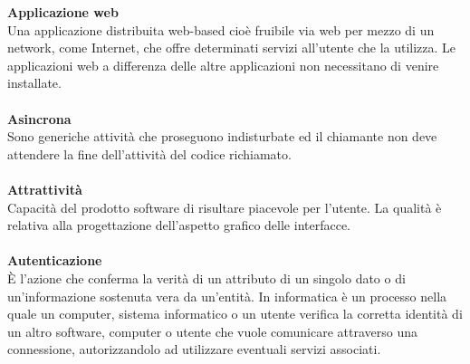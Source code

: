 \textbf{Applicazione web}\\
Una applicazione distribuita web-based cioè fruibile via web per mezzo di un network, come Internet, che offre determinati servizi all'utente che la utilizza. Le applicazioni web a differenza delle altre applicazioni non necessitano di venire installate. \\ \\
\textbf{Asincrona}\\
Sono generiche attività che proseguono indisturbate ed il chiamante non deve attendere la fine dell'attività del codice richiamato. \\ \\
\textbf{Attrattività}\\
Capacità del prodotto software di risultare piacevole per l'utente. La qualità è relativa alla progettazione dell'aspetto grafico delle interfacce.\\ \\
\textbf{Autenticazione}\\
È l’azione che conferma la verità di un attributo di un singolo dato o di un’informazione sostenuta vera da un’entità. In informatica è un processo nella quale un computer, sistema informatico o un utente verifica la corretta identità di un altro software, computer o utente che vuole comunicare attraverso una connessione, autorizzandolo  ad utilizzare eventuali servizi associati. \\ \\
\clearpage